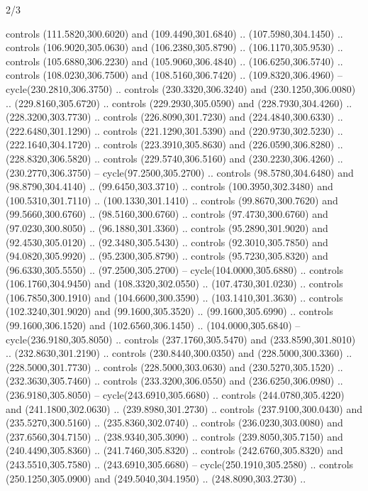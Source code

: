 \begin{flagdescription}{2/3}
\begin{scope}[xshift=0.5\flaglength,yshift=0.5\flagwidth,scale=\stretchfactor]
\begin{scope}[scale=0.001645\flagwidth,yshift=65mm,xshift=-63mm]
\begin{scope}[y=0.80pt, x=0.80pt, yscale=-1,]
\begin{scope}[cm={{1.33333,0.0,0.0,1.33333,(0.0,1e-05)}}]
  controls (111.5820,300.6020) and (109.4490,301.6840) .. (107.5980,304.1450) ..
  controls (106.9020,305.0630) and (106.2380,305.8790) .. (106.1170,305.9530) ..
  controls (105.6880,306.2230) and (105.9060,306.4840) .. (106.6250,306.5740) ..
  controls (108.0230,306.7500) and (108.5160,306.7420) .. (109.8320,306.4960) --
  cycle(230.2810,306.3750) .. controls (230.3320,306.3240) and
  (230.1250,306.0080) .. (229.8160,305.6720) .. controls (229.2930,305.0590) and
  (228.7930,304.4260) .. (228.3200,303.7730) .. controls (226.8090,301.7230) and
  (224.4840,300.6330) .. (222.6480,301.1290) .. controls (221.1290,301.5390) and
  (220.9730,302.5230) .. (222.1640,304.1720) .. controls (223.3910,305.8630) and
  (226.0590,306.8280) .. (228.8320,306.5820) .. controls (229.5740,306.5160) and
  (230.2230,306.4260) .. (230.2770,306.3750) -- cycle(97.2500,305.2700) ..
  controls (98.5780,304.6480) and (98.8790,304.4140) .. (99.6450,303.3710) ..
  controls (100.3950,302.3480) and (100.5310,301.7110) .. (100.1330,301.1410) ..
  controls (99.8670,300.7620) and (99.5660,300.6760) .. (98.5160,300.6760) ..
  controls (97.4730,300.6760) and (97.0230,300.8050) .. (96.1880,301.3360) ..
  controls (95.2890,301.9020) and (92.4530,305.0120) .. (92.3480,305.5430) ..
  controls (92.3010,305.7850) and (94.0820,305.9920) .. (95.2300,305.8790) ..
  controls (95.7230,305.8320) and (96.6330,305.5550) .. (97.2500,305.2700) --
  cycle(104.0000,305.6880) .. controls (106.1760,304.9450) and
  (108.3320,302.0550) .. (107.4730,301.0230) .. controls (106.7850,300.1910) and
  (104.6600,300.3590) .. (103.1410,301.3630) .. controls (102.3240,301.9020) and
  (99.1600,305.3520) .. (99.1600,305.6990) .. controls (99.1600,306.1520) and
  (102.6560,306.1450) .. (104.0000,305.6840) -- cycle(236.9180,305.8050) ..
  controls (237.1760,305.5470) and (233.8590,301.8010) .. (232.8630,301.2190) ..
  controls (230.8440,300.0350) and (228.5000,300.3360) .. (228.5000,301.7730) ..
  controls (228.5000,303.0630) and (230.5270,305.1520) .. (232.3630,305.7460) ..
  controls (233.3200,306.0550) and (236.6250,306.0980) .. (236.9180,305.8050) --
  cycle(243.6910,305.6680) .. controls (244.0780,305.4220) and
  (241.1800,302.0630) .. (239.8980,301.2730) .. controls (237.9100,300.0430) and
  (235.5270,300.5160) .. (235.8360,302.0740) .. controls (236.0230,303.0080) and
  (237.6560,304.7150) .. (238.9340,305.3090) .. controls (239.8050,305.7150) and
  (240.4490,305.8360) .. (241.7460,305.8320) .. controls (242.6760,305.8320) and
  (243.5510,305.7580) .. (243.6910,305.6680) -- cycle(250.1910,305.2580) ..
  controls (250.1250,305.0900) and (249.5040,304.1950) .. (248.8090,303.2730) ..

\end{scope}
\end{scope}
\end{scope}
\end{scope}
\end{flagdescription}
